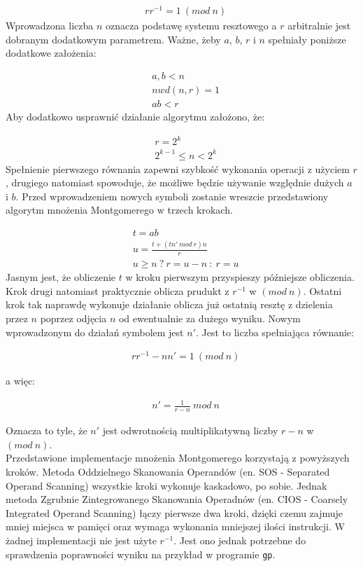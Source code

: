 \documentclass[10pt,journal,compsoc]{IEEEtran}
\begin{document}
\begin{align*}
  &rr^{-1}=1\ (mod\ n)
\end{align*}
\noindent
Wprowadzona liczba $n$ oznacza podstawę systemu resztowego a $r$ arbitralnie jest dobranym dodatkowym parametrem. Ważne, żeby $a$, $b$, $r$ i $n$ spełniały poniższe dodatkowe założenia:  

\begin{align*}
   &a, b < n  \\
   &nwd(n,r) = 1  \\
   &ab < r 
\end{align*}
\noindent
Aby dodatkowo usprawnić działanie algorytmu założono, że:

\begin{align*}
  &r = 2^k \\
  &2^{k-1} \leq n < 2^k 
\end{align*}
\noindent
Spełnienie pierwszego równania zapewni szybkość wykonania operacji z użyciem $r$, drugiego natomiast spowoduje, że możliwe będzie używanie względnie dużych $a$ i $b$. Przed wprowadzeniem nowych symboli zostanie wreszcie przedstawiony algorytm mnożenia Montgomerego w trzech krokach. 

\begin{align*}
  &t = ab\\
  &u = \frac{t+(tn'\ mod\ r)n}{r}\\
  &u \geq n\ ?\ r = u-n\ :\ r = u
\end{align*}
\noindent
Jasnym jest, że obliczenie $t$ w kroku pierwszym przyspieszy późniejsze obliczenia. Krok drugi natomiast praktycznie oblicza prudukt z $r^{-1}$ w $(mod\ n)$. Ostatni krok tak naprawdę wykonuje działanie oblicza już ostatnią resztę z dzielenia przez $n$ poprzez odjęcia $n$ od ewentualnie za dużego wyniku. Nowym wprowadzonym do działań symbolem jest $n'$. Jest to liczba spełniająca równanie:

\begin{align*}
  &rr^{-1}-nn'=1\ (mod\ n)
\end{align*}

a więc:

\begin{align*}
  &n'= \frac{1}{r-n}\ mod\ n
\end{align*}

\noindent
Oznacza to tyle, że $n'$ jest odwrotnością multiplikatywną liczby $r-n$ w $(mod\ n)$. \\ \newline
Przedstawione implementacje mnożenia Montgomerego korzystają z powyższych kroków. Metoda Oddzielnego Skanowania Operandów (en. SOS - Separated Operand Scanning) wszystkie kroki wykonuje kaskadowo, po sobie. Jednak metoda Zgrubnie Zintegrowanego Skanowania Operadnów (en. CIOS - Coarsely Integrated Operand Scanning) łączy pierwsze dwa kroki, dzięki czemu zajmuje mniej miejsca w pamięci oraz wymaga wykonania mniejszej ilości instrukcji. W żadnej implementacji nie jest użyte $r^{-1}$. Jest ono jednak potrzebne do sprawdzenia poprawności wyniku na przykład w programie \texttt{gp}.
\end{document}
